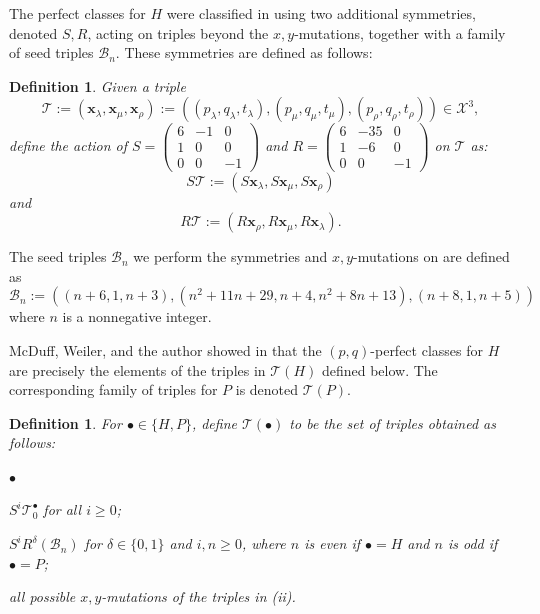 \documentclass[11pt, reqno]{amsart}
\newtheorem{definition}[thm]{Definition}
\theoremstyle{remark}
\numberwithin{equation}{subsection}
\numberwithin{figure}{section}
\theoremstyle{customremark}
\newcommand{\Tt}{\mathcal{T}}
\newenvironment{itemlist}
   { \begin{list} {$\bullet$}
         { \setlength{\topsep}{.5ex}  \setlength{\itemsep}{.5ex} \setlength{\leftmargin}{2.5ex} } }
   { \end{list} }
\newcommand{\la}{{\lambda}}
\begin{document}
The perfect classes for $H$ were classified in \cite{MMW} using two additional symmetries, denoted $S,R$, acting on triples beyond the $x,y$-mutations, together with a family of seed triples $\mathcal{B}_n.$ These symmetries are defined as follows: 

\begin{definition} \label{def:SRintro}
    Given a triple \[\Tt:=(\bm{x}_\la,\bm{x}_\mu,\bm{x}_\rho):=\left((p_\la,q_\la,t_\la),(p_\mu,q_\mu,t_\mu),(p_\rho,q_\rho,t_\rho) \right) \in \mathcal{X}^3,\] define the action of $S=\begin{pmatrix}
        6 & -1 & 0 \\ 1 & 0 & 0 \\ 0 & 0 & -1
    \end{pmatrix}$ and $R=\begin{pmatrix}
        6 & -35 & 0\\ 1 & -6 &0 \\ 0& 0 & -1
    \end{pmatrix}$ on $\Tt$ as: 
    \[ S\Tt:=\left(S\bm{x}_\la,S\bm{x}_\mu,S\bm{x}_\rho\right)\] and
     \[ R\Tt:=\left(R\bm{x}_\rho,R\bm{x}_\mu,R\bm{x}_\la\right).\]
\end{definition}

The seed triples $\mathcal{B}_n$ we perform the symmetries and $x,y$-mutations on are defined as 
\[ \mathcal{B}_n:=\left((n+6,1,n+3),(n^2+11n+29,n+4,n^2+8n+13),(n+8,1,n+5)\right) \]
where $n$ is a nonnegative integer. 

McDuff, Weiler, and the author showed in \cite{MMW} that the $(p,q)$-perfect classes for $H$ are precisely the elements of the triples in $\Tt(H)$ defined below. The corresponding family of triples for $P$ is denoted $\Tt(P).$


\begin{definition}  \label{def:triplesIntro}
For $\bullet\in\{H,P\}$, define $\Tt(\bullet)$ to be the set of triples obtained as follows:
\begin{itemlist}
\item[{(i)}] $S^i\Tt_0^\bullet$ for all $i\geq 0$;

\item[{(ii)}] $S^iR^\delta(\mathcal B_n)$ for $\delta\in\{0,1\}$ and $i,n\geq 0$, where $n$ is even if $\bullet=H$ and $n$ is odd if $\bullet=P$;

\item[{(iii)}] all possible $x,y$-mutations of the triples in (ii).

\end{itemlist}

\end{definition}
\end{document}
